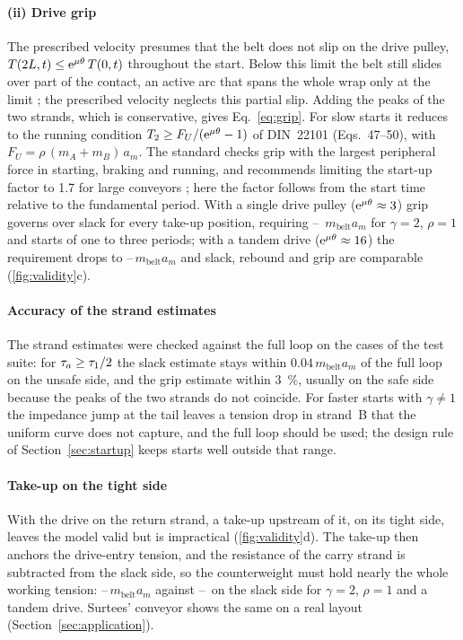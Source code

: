 \paragraph{(ii) Drive grip} The prescribed velocity presumes that the belt does not slip on the
drive pulley, $T(2L,t)\le\mathrm{e}^{\mu\theta}\,T(0,t)$ throughout the start. Below this limit the belt still slides
over part of the contact, an active arc that spans the whole wrap only at the limit
\citep{lubarda2015}; the prescribed velocity neglects this partial slip. Adding the peaks of the two strands,
which is conservative, gives Eq.~\eqref{eq:grip}. For slow starts it reduces to the running
condition $T_2\ge F_U/(\mathrm{e}^{\mu\theta}-1)$ of DIN~22101 (Eqs.~47--50), with
$F_U=\rho\,(m_A+m_B)\,a_m$. The standard checks grip with the largest peripheral force in starting,
braking and running, and recommends limiting the start-up factor to 1.7 for large conveyors
\citep[\S7.3.1, \S8.2.2]{din22101}; here the factor follows from the start time relative to the
fundamental period. With a single drive pulley ($\mathrm{e}^{\mu\theta}\approx3$) grip governs over slack for every
take-up position, requiring \NumValidityGripThreeMin--\NumValidityGripThreeMax\,%
$m_\mathrm{belt}a_m$ for $\gamma=2$, $\rho=1$ and starts of one to three periods; with a tandem
drive ($\mathrm{e}^{\mu\theta}\approx16$) the requirement drops to
\NumValidityGripSixteenMin--\NumValidityGripSixteenMax\,$m_\mathrm{belt}a_m$ and slack, rebound and
grip are comparable (\cref{fig:validity}c).

\paragraph{Accuracy of the strand estimates} The strand estimates were checked against the full
loop on the cases of the test suite: for $\tau_a\ge\tau_{1}/2$ the slack estimate stays within
$0.04\,m_\mathrm{belt}a_m$ of the full loop on the unsafe side, and the grip estimate within
\qty{3}{\percent}, usually on the safe side because the peaks of the two strands do not coincide.
For faster starts with $\gamma\ne1$ the impedance jump at the tail leaves a tension drop in
strand~B that the uniform curve does not capture, and the full loop should be used; the design rule
of Section~\ref{sec:startup} keeps starts well outside that range.

\paragraph{Take-up on the tight side} With the drive on the return strand, a take-up upstream of
it, on its tight side, leaves the model valid but is impractical (\cref{fig:validity}d). The
take-up then anchors the drive-entry tension, and the resistance of the carry strand is subtracted
from the slack side, so the counterweight must hold nearly the whole working tension:
\NumTightMin--\NumTightMax\,$m_\mathrm{belt}a_m$ against \NumSlackMin--\NumSlackMax\ on the slack
side for $\gamma=2$, $\rho=1$ and a tandem drive. Surtees' conveyor shows the same on a real layout
(Section~\ref{sec:application}).
